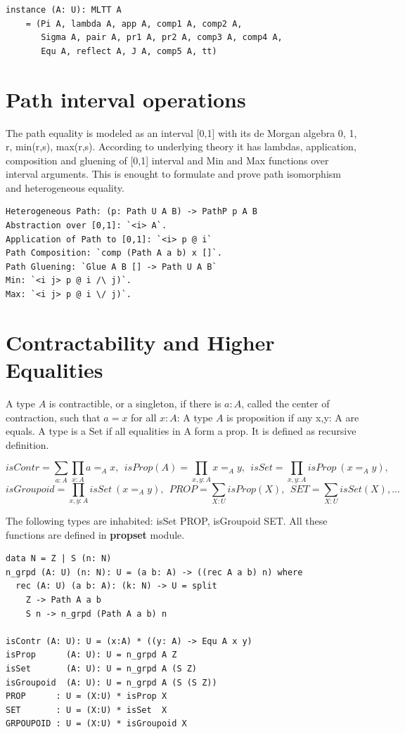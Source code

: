 \documentclass{svproc}
\begin{document}
\begin{lstlisting}[mathescape=true]
instance (A: U): MLTT A
    = (Pi A, lambda A, app A, comp1 A, comp2 A,
       Sigma A, pair A, pr1 A, pr2 A, comp3 A, comp4 A,
       Equ A, reflect A, J A, comp5 A, tt)
\end{lstlisting}

\newpage
\section{Path interval operations}

The path equality is modeled as an interval [0,1] with
its de Morgan algebra 0, 1, r, min(r,s), max(r,s). According to underlying theory
it has lambdas, application, composition and gluening of [0,1] interval and Min and Max
functions over interval arguments. This is enought to formulate and prove path
isomorphism and heterogeneous equality.

\begin{lstlisting}[mathescape=true]
Heterogeneous Path: (p: Path U A B) -> PathP p A B
Abstraction over [0,1]: `<i> A`.
Application of Path to [0,1]: `<i> p @ i`
Path Composition: `comp (Path A a b) x []`.
Path Gluening: `Glue A B [] -> Path U A B`
Min: `<i j> p @ i /\ j)`.
Max: `<i j> p @ i \/ j)`.
\end{lstlisting}


\section{Contractability and Higher Equalities}

A type $A$ is contractible, or a singleton, if there is $a : A$,
called the center of contraction, such that $a = x$ for all $x : A$:
A type $A$ is proposition if any x,y: A are equals.
A type is a Set if all equalities in A form a prop.
It is defined as recursive definition.

$$isContr = \sum_{a:A}\prod_{x:A} a =_A x,\ \ 
  isProp(A) = \prod_{x,y:A} x =_A y,\ \ 
  isSet = \prod_{x,y:A} isProp\ (x =_A y),\ \ $$
$$isGroupoid = \prod_{x,y:A} isSet\ (x =_A y),\ \ 
  PROP = \sum_{X:U}isProp(X),\ \ 
  SET = \sum_{X:U}isSet(X),...$$

The following types are inhabited: isSet PROP, isGroupoid SET.
All these functions are defined in {\bf propset} module.

\begin{lstlisting}[mathescape=true]
data N = Z | S (n: N)
n_grpd (A: U) (n: N): U = (a b: A) -> ((rec A a b) n) where
  rec (A: U) (a b: A): (k: N) -> U = split
    Z -> Path A a b
    S n -> n_grpd (Path A a b) n

isContr (A: U): U = (x:A) * ((y: A) -> Equ A x y)
isProp      (A: U): U = n_grpd A Z
isSet       (A: U): U = n_grpd A (S Z)
isGroupoid  (A: U): U = n_grpd A (S (S Z))
PROP      : U = (X:U) * isProp X
SET       : U = (X:U) * isSet  X
GRPOUPOID : U = (X:U) * isGroupoid X
\end{lstlisting}
\end{document}
